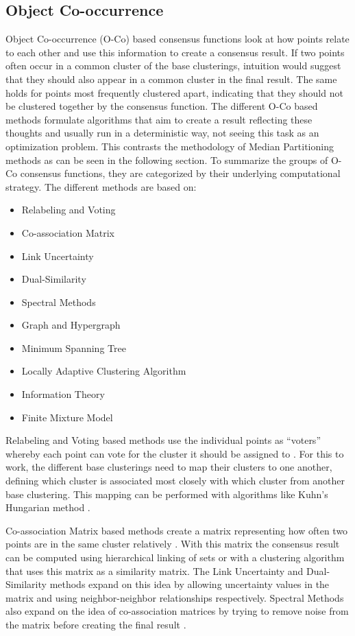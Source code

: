 \documentclass[
	a4paper,
	english,
	twoside,
	openright,               
	11pt                            
	]{report}
\begin{document}
\subsection{Object Co-occurrence}
Object Co-occurrence (O-Co) based consensus functions look at how points relate to each other and use this information to create a consensus result. If two points often occur in a common cluster of the base clusterings, intuition would suggest that they should also appear in a common cluster in the final result. The same holds for points most frequently clustered apart, indicating that they should not be clustered together by the consensus function. The different O-Co based methods formulate algorithms that aim to create a result reflecting these thoughts and usually run in a deterministic way, not seeing this task as an optimization problem. This contrasts the methodology of Median Partitioning methods as can be seen in the following section. To summarize the groups of O-Co consensus functions, they are categorized by their underlying computational strategy. The different methods are based on:

\begin{itemize}
  \item Relabeling and Voting
  \item Co-association Matrix
  \item Link Uncertainty
  \item Dual-Similarity
  \item Spectral Methods
  \item Graph and Hypergraph
  \item Minimum Spanning Tree
  \item Locally Adaptive Clustering Algorithm
  \item Information Theory
  \item Finite Mixture Model
\end{itemize}

Relabeling and Voting based methods use the individual points as  ``voters'' whereby each point can vote for the cluster it should be assigned to \cite{4470298}. For this to work, the different base clusterings need to map their clusters to one another, defining which cluster is associated most closely with which cluster from another base clustering. This mapping can be performed with algorithms like Kuhn’s Hungarian method \cite{Kuhn2010}.

Co-association Matrix based methods create a matrix representing how often two points are in the same cluster relatively  \cite{Monti2003}. With this matrix the consensus result can be computed using hierarchical linking of sets or with a clustering algorithm that uses this matrix as a similarity matrix. The Link Uncertainty \cite{6413733} and Dual-Similarity \cite{7344797} methods expand on this idea by allowing uncertainty values in the matrix and using neighbor-neighbor relationships respectively. Spectral Methods also expand on the idea of co-association matrices by trying to remove noise from the matrix before creating the final result \cite{Tao:2016:RSE:2983323.2983745}.
\end{document}
